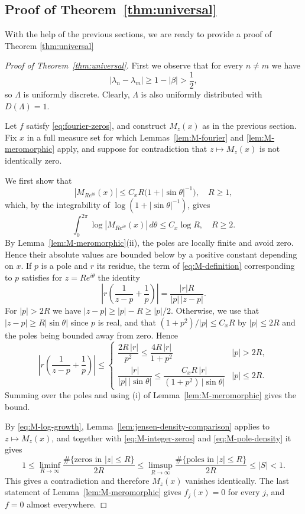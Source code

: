\documentclass[reqno,a4paper,12pt]{amsart}
\numberwithin{equation}{section}
\newcommand\1{\mathds{1}}
\begin{document}
\subsection{Proof of Theorem~\ref{thm:universal}}
With the help of the previous sections, we are ready to provide a proof of Theorem \ref{thm:universal}

\begin{proof}[Proof of Theorem~\ref{thm:universal}]
First we observe that for every $n\ne m$ we have
\[
 |\lambda_n-\lambda_m|\geq1-|\beta|>\frac12,
\]
so $\Lambda$ is uniformly discrete.  Clearly, $\Lambda$ is also uniformly distributed with $D(\Lambda)=1$.

Let $f$ satisfy \eqref{eq:fourier-zeros}, and construct $M_z(x)$ as
in the previous section. Fix $x$ in a full measure set for which
Lemmas~\ref{lem:M-fourier} and \ref{lem:M-meromorphic} apply, and
suppose for contradiction that $z\mapsto M_z(x)$ is not identically zero.

We first show that
\[
 |M_{Re^{i\theta}}(x)|\leq C_xR\bigl(1+|\sin\theta|^{-1}\bigr),
 \quad R\geq1,
\]
which, by the integrability of $\log(1+|\sin\theta|^{-1})$, gives
\begin{equation}\label{eq:M-log-growth}
 \int_0^{2\pi}\log|M_{Re^{i\theta}}(x)|\,d\theta\leq C_x\log R,
 \quad R\geq2.
\end{equation}
By Lemma~\ref{lem:M-meromorphic}(ii), the poles are locally finite
and avoid zero. Hence their absolute values are bounded below by a
positive constant depending on $x$. If $p$ is a pole and $r$ its
residue, the term of \eqref{eq:M-definition}
corresponding to $p$ satisfies for $z=Re^{i\theta}$ the identity
\[
 \left|r\left(\frac1{z-p}+\frac1p\right)\right|
 =\frac{|r|R}{|p|\,|z-p|}.
\]
For $|p|>2R$ we have $|z-p|\geq|p|-R\geq|p|/2$.  Otherwise, we use
that $|z-p|\geq R|\sin\theta|$ since $p$ is real, and that
$(1+p^2)/|p|\leq C_xR$ by $|p|\leq2R$ and the poles being bounded away
from zero.  Hence
\[
 \left|r\left(\frac1{z-p}+\frac1p\right)\right|
 \leq
 \begin{cases}
  \dfrac{2R\,|r|}{p^2}
  \leq\dfrac{4R\,|r|}{1+p^2}
  & |p|>2R,\\[3mm]
  \dfrac{|r|}{|p|\,|\sin\theta|}
  \leq\dfrac{C_xR\,|r|}{(1+p^2)\,|\sin\theta|}
  & |p|\leq2R.
 \end{cases}
\]
Summing over the poles and using (i) of
Lemma~\ref{lem:M-meromorphic} gives the bound.

By \eqref{eq:M-log-growth}, Lemma~\ref{lem:jensen-density-comparison}
applies to $z\mapsto M_z(x)$, and together with
\eqref{eq:M-integer-zeros} and \eqref{eq:M-pole-density} it gives
\[
 1\leq
 \liminf_{R\to\infty}
 \frac{\#\{\text{zeros in }|z|\leq R\}}{2R}
 \leq
 \limsup_{R\to\infty}
 \frac{\#\{\text{poles in }|z|\leq R\}}{2R}
 \leq|S|<1.
\]
This gives a contradiction and therefore $M_z(x)$ vanishes identically. The last
statement of Lemma~\ref{lem:M-meromorphic} gives $f_j(x)=0$ for every
$j$, and $f=0$ almost everywhere.
\end{proof}
\end{document}
